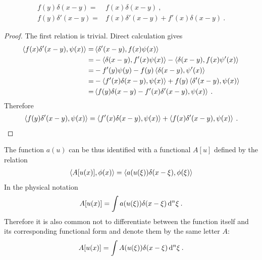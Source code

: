 \begin{lemma} \label{lemma:delta}
    \begin{align}
        f(y) \delta (x-y) =& f(x) \delta(x-y) \:, \\
        f(y) \delta'(x-y) =& f(x) \delta'(x-y) + f'(x) \delta(x-y) \:.
    \end{align}
\end{lemma}
\begin{proof}
    The first relation is trivial.
    Direct calculation gives
    \begin{align*}
        \left \langle f(x) \delta'(x-y) ,\psi(x) \right \rangle 
        =& \left \langle \delta'(x-y) ,f(x) \psi(x) \right \rangle 
         \\ =& -\left \langle \delta(x-y) ,f'(x)\psi(x) \right \rangle - \left \langle \delta(x-y) ,f(x)\psi'(x) \right \rangle 
         \\ =& -f'(y) \psi(y) - f(y) \left \langle \delta(x-y) ,\psi'(x) \right \rangle 
         \\ =& - \left \langle f'(x)  \delta(x-y) ,\psi(x) \right \rangle + f(y) \left \langle \delta'(x-y) ,\psi(x) \right \rangle 
         \\ =& \left \langle f(y) \delta(x-y) - f'(x) \delta'(x-y) ,\psi(x) \right \rangle \:.
    \end{align*}
    Therefore
    \begin{align}
        \left \langle f(y) \delta'(x-y) ,\psi(x) \right \rangle = \left \langle f'(x) \delta(x-y) ,\psi(x) \right \rangle + \left \langle f(x) \delta'(x-y) ,\psi(x) \right \rangle \:.
    \end{align} 
\end{proof}


The function $a(u)$ can be thus identified with a functional $A[u]$ defined by the relation
\begin{align}
    \left \langle A[u(x)] ,\phi(x) \right \rangle  = \left \langle a(u(\xi)) \delta(x-\xi) ,\phi(\xi) \right \rangle
\end{align}
In the physical notation
\begin{align}
    A[u(x)] = \int a(u(\xi)) \delta(x-\xi) \, \mathrm{d}^n \xi \:.
\end{align}
Therefore it is also common not to differentiate between the function itself and its corresponding functional form and denote them by the same letter $A$:
\begin{align}
    A[u(x)] = \int A(u(\xi)) \delta(x-\xi) \, \mathrm{d}^n \xi \:.
\end{align}



